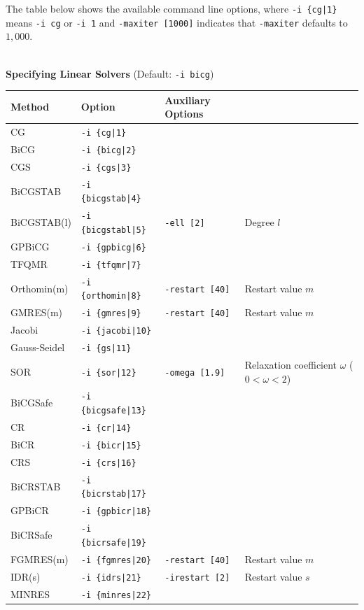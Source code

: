 \documentclass[a4paper]{article}
\begin{document}
The table below shows the available command line options, 
where \verb=-i {cg|1}= means \verb=-i cg= or \verb=-i 1= and \verb=-maxiter [1000]= indicates that \verb=-maxiter= defaults to $1,000$.
\\
\\
\begin{minipage}[t]{\textwidth}
\begin{center}
{\bf Specifying Linear Solvers} (Default: \verb=-i bicg=) \\
\begin{tabular}{l|lll}\hline\hline
 Method      & Option              &  Auxiliary Options  & \\ \hline
 CG          & \verb=-i {cg|1}=         &    \\ 
 BiCG        & \verb=-i {bicg|2}=       &    \\
 CGS         & \verb=-i {cgs|3}=        &    \\
 BiCGSTAB    & \verb=-i {bicgstab|4}=   &    \\
 BiCGSTAB(l) & \verb=-i {bicgstabl|5}=  & \verb=-ell [2]=      & Degree $l$ \\
 GPBiCG      & \verb=-i {gpbicg|6}=     &    \\
 TFQMR       & \verb=-i {tfqmr|7}=      &    \\
 Orthomin(m) & \verb=-i {orthomin|8}=   & \verb=-restart [40]= & Restart
 value $m$  \\
 GMRES(m)    & \verb=-i {gmres|9}=      & \verb=-restart [40]= & Restart value $m$  \\ 
 Jacobi      & \verb=-i {jacobi|10}=    &    \\
 Gauss-Seidel& \verb=-i {gs|11}=        &    \\
 SOR         & \verb=-i {sor|12}=       & \verb=-omega [1.9]=  & Relaxation coefficient $\omega$ ($0<\omega<2$) \\
 BiCGSafe    & \verb=-i {bicgsafe|13}=     &    \\
 CR          & \verb=-i {cr|14}=        &    \\ 
 BiCR        & \verb=-i {bicr|15}=      &    \\
 CRS         & \verb=-i {crs|16}=       &    \\
 BiCRSTAB    & \verb=-i {bicrstab|17}=  &    \\
 GPBiCR      & \verb=-i {gpbicr|18}=    &    \\
 BiCRSafe    & \verb=-i {bicrsafe|19}=  &    \\
 FGMRES(m)   & \verb=-i {fgmres|20}=    & \verb=-restart [40]= & Restart value $m$   \\ 
 IDR(s)      & \verb=-i {idrs|21}=      & \verb=-irestart [2]= & Restart
 value $s$  \\ 
 MINRES      & \verb=-i {minres|22}=    &    \\
\hline         
\end{tabular}
\end{center}
\end{minipage}
\end{document}
